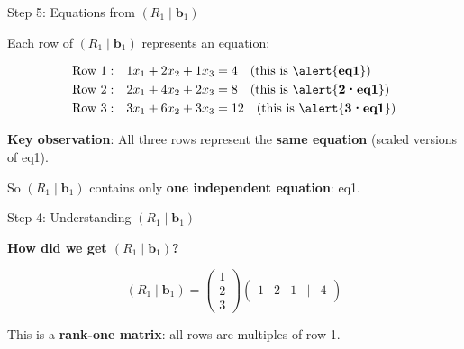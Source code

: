 \documentclass[10pt]{beamer}
\theoremstyle{definition}
\newcommand{\x}[1]{\alert{\textbf{#1}}}
\begin{document}
\begin{frame}{Step 5: Equations from $(R_1 \mid \mathbf{b}_1)$}

Each row of $(R_1 \mid \mathbf{b}_1)$ represents an equation:

\vspace{0.5em}

\begin{align*}
\text{Row 1}: &\quad 1x_1 + 2x_2 + 1x_3 = 4 \quad \text{(this is \x{eq1})} \\
\text{Row 2}: &\quad 2x_1 + 4x_2 + 2x_3 = 8 \quad \text{(this is \x{2·eq1})} \\
\text{Row 3}: &\quad 3x_1 + 6x_2 + 3x_3 = 12 \quad \text{(this is \x{3·eq1})}
\end{align*}

\vspace{1em}

\x{Key observation}: All three rows represent the \textbf{same equation} (scaled versions of eq1).

\vspace{0.5em}

So $(R_1 \mid \mathbf{b}_1)$ contains only \x{one independent equation}: eq1.

\end{frame}

\begin{frame}{Step 4: Understanding $(R_1 \mid \mathbf{b}_1)$}

\x{How did we get $(R_1 \mid \mathbf{b}_1)$?}

$$(R_1 \mid \mathbf{b}_1) = \begin{pmatrix} 1 \\ 2 \\ 3 \end{pmatrix} \begin{pmatrix} 1 & 2 & 1 & | & 4 \end{pmatrix}$$

\vspace{1em}

This is a \x{rank-one matrix}: all rows are multiples of row 1.

\end{frame}
\end{document}
